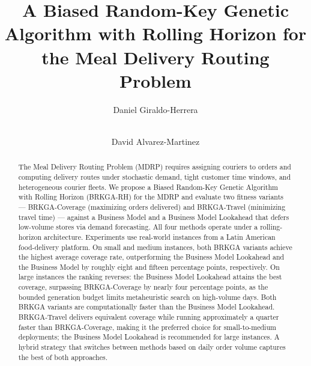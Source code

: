 \documentclass[runningheads]{llncs}
\begin{document}
%
\title{A Biased Random-Key Genetic Algorithm with Rolling Horizon for the Meal Delivery Routing Problem}
%
%
\author{Daniel Giraldo-Herrera \and \\
David Alvarez-Martinez
}
%
%
%
\maketitle              %
%
\begin{abstract}
The Meal Delivery Routing Problem (MDRP) requires assigning couriers to orders and computing delivery routes under stochastic demand, tight customer time windows, and heterogeneous courier fleets. We propose a Biased Random-Key Genetic Algorithm with Rolling Horizon (BRKGA-RH) for the MDRP and evaluate two fitness variants --- BRKGA-Coverage (maximizing orders delivered) and BRKGA-Travel (minimizing travel time) --- against a Business Model and a Business Model Lookahead that defers low-volume stores via demand forecasting. All four methods operate under a rolling-horizon architecture. Experiments use real-world instances from a Latin American food-delivery platform. On small and medium instances, both BRKGA variants achieve the highest average coverage rate, outperforming the Business Model Lookahead and the Business Model by roughly eight and fifteen percentage points, respectively. On large instances the ranking reverses: the Business Model Lookahead attains the best coverage, surpassing BRKGA-Coverage by nearly four percentage points, as the bounded generation budget limits metaheuristic search on high-volume days. Both BRKGA variants are computationally faster than the Business Model Lookahead. BRKGA-Travel delivers equivalent coverage while running approximately a quarter faster than BRKGA-Coverage, making it the preferred choice for small-to-medium deployments; the Business Model Lookahead is recommended for large instances. A hybrid strategy that switches between methods based on daily order volume captures the best of both approaches.

\end{abstract}
%
%
%
\end{document}
